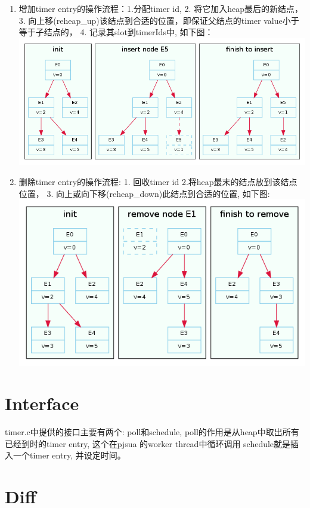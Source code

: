\documentclass[a4paper, 12pt]{article}
\begin{document}
\begin{CJK}{UTF8}{gkai}
\begin{enumerate}
\item
增加timer entry的操作流程：1.分配timer id, 2. 将它加入heap最后的新结点，3. 向上移(reheap\_up)该结点到合适的位置，即保证父结点的timer value小于等于子结点的，
4. 记录其slot到timerIds中, 如下图：\\
\includegraphics[width=\textwidth]{timerinsertnode.png}

\item
删除timer entry的操作流程: 1. 回收timer id 2.将heap最末的结点放到该结点位置，  3. 向上或向下移(reheap\_down)此结点到合适的位置, 如下图:\\
\includegraphics[width=\textwidth]{timerremovenode.png}

\end{enumerate}

\section{Interface}
timer.c中提供的接口主要有两个: poll和schedule,  
poll的作用是从heap中取出所有已经到时的timer entry, 这个在pjsua 的worker thread中循环调用
schedule就是插入一个timer entry, 并设定时间。

\section{Diff}



\end{CJK}
\end{document}
